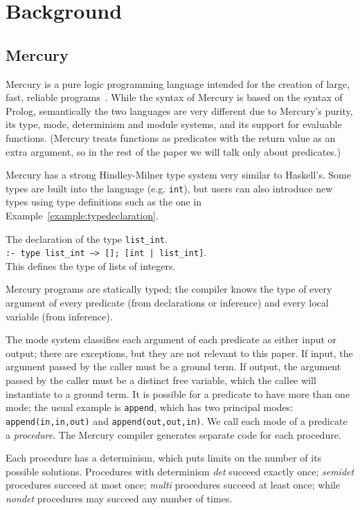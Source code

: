 \documentclass{tlp}
\newcommand{\code}[1]{{\tt#1}}
\begin{document}
\section{Background}
\label{seCbg}

\subsection{Mercury}
\label{seCbgCmercury}

Mercury is a pure logic programming language
intended for the creation of large, fast,
reliable programs~\cite{Somogyi96mercury}.
While the syntax of Mercury is based on the syntax of Prolog,
semantically the two languages are very different due to Mercury's purity,
its type, mode, determinism and module systems,
and its support for evaluable functions.
(Mercury treats functions
as predicates with the return value as an extra argument,
so in the rest of the paper we will talk only about predicates.)

Mercury has a strong Hindley-Milner type system very similar to Haskell's.
Some types are built into the language (e.g. \code{int}),
but users can also introduce new types using type definitions
such as the one in Example~\ref{example:typedeclaration}.
\begin{example} The declaration of the type \code{list\_int}.\\
\code{:- type list\_int ---> []; [int | list\_int]}.\\
This defines the type of lists of integers.
\hfill 
\label{example:typedeclaration}
\end{example}
Mercury programs are statically typed; the compiler knows the type of
every argument of every predicate (from declarations or inference)
and every local variable (from inference).

The mode system classifies each argument of each predicate
as either input or output;
there are exceptions, but they are not relevant to this paper.
If input, the argument passed by the caller must be a ground term.
If output, the argument passed by the caller must be a distinct free variable,
which the callee will instantiate to a ground term.
It is possible for a predicate to have more than one mode;
the usual example is \code{append}, which has two principal modes:
\code{append(in,in,out)} and \code{append(out,out,in)}.
We call each mode of a predicate a \emph{procedure}.
The Mercury compiler generates separate code for each procedure.

Each procedure has a determinism,
which puts limits on the number of its possible solutions.
Procedures with determinism \emph{det} succeed exactly once;
\emph{semidet} procedures succeed at most once;
\emph{multi} procedures succeed at least once;
while \emph{nondet} procedures may succeed any number of times.
\end{document}
